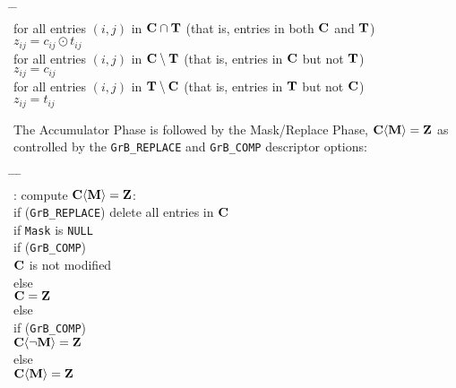 \documentclass[12pt]{article}
\begin{document}
    {\small
    \begin{tabbing}
    \hspace{2em} \= \hspace{2em} \= \hspace{2em} \= \\
    \> for all entries $(i,j)$ in ${\bf C \cap T}$
    (that is, entries in both ${\bf C}$ and ${\bf T}$) \\
    \> \> $z_{ij} = c_{ij} \odot t_{ij}$ \\
    \> for all entries $(i,j)$ in ${\bf C \setminus T}$
    (that is, entries in ${\bf C}$ but not ${\bf T}$) \\
    \> \> $z_{ij} = c_{ij}$ \\
    \> for all entries $(i,j)$ in ${\bf T \setminus C}$
    (that is, entries in ${\bf T}$ but not ${\bf C}$) \\
    \> \> $z_{ij} = t_{ij}$
    \end{tabbing} }
The Accumulator Phase is followed by the Mask/Replace Phase, ${\bf C \langle M \rangle = Z}$
as controlled by the \verb'GrB_REPLACE' and \verb'GrB_COMP' descriptor options:
    \vspace{-0.2in}
    {\small
    \begin{tabbing}
    \hspace{2em} \= \hspace{2em} \= \hspace{2em} \= \hspace{2em} \= \\
    : compute ${\bf C \langle M \rangle = Z}$: \\
    \> \> if (\verb'GrB_REPLACE') delete all entries in ${\bf C}$ \\
    \> \> if \verb'Mask' is \verb'NULL' \\
    \> \>\>    if (\verb'GrB_COMP') \\
    \> \>\>\>      ${\bf C}$ is not modified \\
    \> \>\>    else \\
    \> \>\>\>      ${\bf C = Z}$ \\
    \> \> else \\
    \> \>\>    if (\verb'GrB_COMP') \\
    \> \>\>\>      ${\bf C \langle \neg M \rangle  = Z}$ \\
    \> \>\>    else \\
    \> \>\>\>      ${\bf C \langle M \rangle  = Z}$
    \end{tabbing} }
\end{document}
